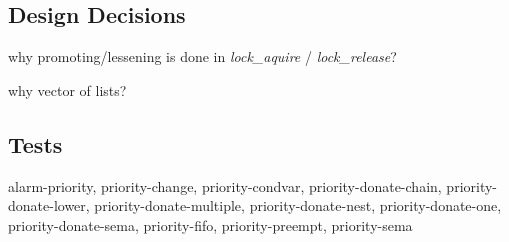 

    \subsection{Design Decisions}

	why promoting/lessening is done in \textit{lock\_aquire} / \textit{lock\_release}?
	
	why vector of lists?

    \subsection{Tests}

	alarm-priority, priority-change, priority-condvar, priority-donate-chain, priority-donate-lower, priority-donate-multiple, priority-donate-nest, priority-donate-one, priority-donate-sema, priority-fifo, priority-preempt, priority-sema